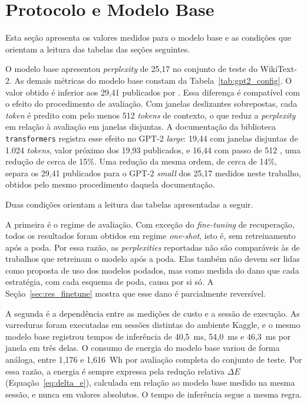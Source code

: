 \section{Protocolo e Modelo Base}\label{sec:res_protocolo}

Esta seção apresenta os valores medidos para o modelo base e as condições que orientam a
leitura das tabelas das seções seguintes.

O modelo base apresentou
\textit{perplexity} de 25,17 no conjunto de teste do WikiText-2. As demais métricas do modelo
base constam da Tabela~\ref{tab:gpt2_config}. O valor obtido é inferior aos 29,41 publicados
por . Essa diferença é compatível com o efeito do procedimento de
avaliação. Com janelas deslizantes sobrepostas, cada \textit{token} é predito com pelo menos
512 \textit{tokens} de contexto, o que reduz a \textit{perplexity} em relação à avaliação em
janelas disjuntas. A documentação da biblioteca \texttt{transformers} registra esse efeito no
GPT-2 \textit{large}: 19,44 com janelas disjuntas de 1.024 \textit{tokens}, valor próximo dos
19,93 publicados, e 16,44 com passo de 512 \cite{HuggingFacePerplexity}, uma redução de cerca
de 15\%. Uma redução da mesma ordem, de cerca de 14\%, separa os 29,41 publicados para o GPT-2
\textit{small} dos 25,17 medidos neste trabalho, obtidos pelo mesmo procedimento daquela
documentação.

Duas condições orientam a leitura das tabelas apresentadas a seguir.

A primeira é o regime de avaliação. Com exceção do \textit{fine-tuning} de recuperação,
todos os resultados foram obtidos em regime \textit{one-shot}, isto é, sem retreinamento após
a poda. Por essa razão, as \textit{perplexities} reportadas
não são comparáveis às de trabalhos que retreinam o modelo após a poda. Elas também não devem
ser lidas como proposta de uso dos modelos podados, mas como medida do dano que cada
estratégia, com cada esquema de poda, causa por si só. A Seção~\ref{sec:res_finetune} mostra
que esse dano é parcialmente reversível.

A segunda é a dependência entre as medições de custo e a sessão de execução. As varreduras
foram executadas em sessões distintas do ambiente Kaggle, e o mesmo modelo base registrou
tempos de inferência de 40,5~ms, 54,0~ms e 46,3~ms por janela em três delas. O consumo de
energia do modelo base variou de forma análoga, entre 1,176 e 1,616~Wh por avaliação completa
do conjunto de teste. Por essa razão, a energia é sempre expressa pela redução relativa $\Delta
E$ (Equação~\ref{eq:delta_e}), calculada em relação ao modelo base medido na mesma sessão, e
nunca em valores absolutos. O tempo de inferência segue a mesma regra.

